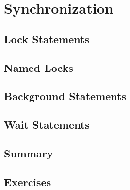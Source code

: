 \chapter{Synchronization}


\section{Lock Statements}


\section{Named Locks}


\section{Background Statements}


\section{Wait Statements}


\section{Summary}


\section{Exercises}

